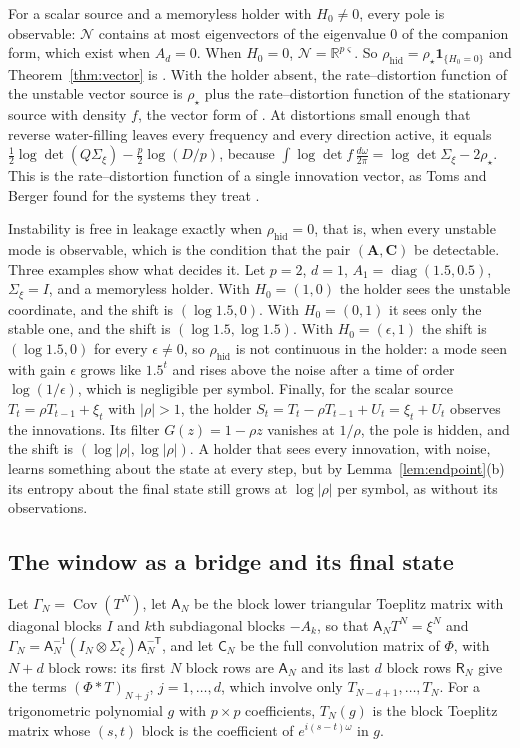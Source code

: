 \documentclass[11pt,onecolumn]{IEEEtran}
\newcommand{\R}{\mathbb{R}}
\newcommand{\Cov}{\operatorname{Cov}}
\newcommand{\dw}{\tfrac{d\omega}{2\pi}}
\newcommand{\bA}{\mathbf A}
\newcommand{\bC}{\mathbf C}
\newcommand{\rhid}{\rho_{\mathrm{hid}}}
\begin{document}
For a scalar source and a memoryless holder with $H_0\ne0$, every pole
is observable: $\mathcal N$ contains at most eigenvectors of the
eigenvalue $0$ of the companion form, which exist when $A_d=0$. When
$H_0=0$, $\mathcal N=\R^{p\varsigma}$. So
$\rhid=\rho_\star\mathbf 1_{\{H_0=0\}}$ and Theorem~\ref{thm:vector} is
\cite[Theorem~26]{part3}. With the holder absent, the rate--distortion
function of the unstable vector source is $\rho_\star$ plus the
rate--distortion function of the stationary source with density $f$,
the vector form of \cite{hashimoto1980,grayhashimoto2008}. At
distortions small enough that reverse water-filling leaves every
frequency and every direction active, it equals
$\tfrac12\log\det(Q\Sigma_\xi)-\tfrac p2\log(D/p)$, because
$\int\log\det f\,\dw=\log\det\Sigma_\xi-2\rho_\star$. This is the
rate--distortion function of a single innovation vector, as Toms and
Berger found for the systems they treat \cite{toms1971}.

Instability is free in leakage exactly when $\rhid=0$, that is, when
every unstable mode is observable, which is the condition that the pair
$(\bA,\bC)$ be detectable. Three examples show what decides it. Let
$p=2$, $d=1$, $A_1=\operatorname{diag}(1.5,0.5)$, $\Sigma_\xi=I$, and a
memoryless holder. With $H_0=(1,0)$ the holder sees the unstable
coordinate, and the shift is $(\log1.5,0)$. With $H_0=(0,1)$ it sees
only the stable one, and the shift is $(\log1.5,\log1.5)$. With
$H_0=(\epsilon,1)$ the shift is $(\log1.5,0)$ for every $\epsilon\ne0$,
so $\rhid$ is not continuous in the holder: a mode seen with gain
$\epsilon$ grows like $1.5^t$ and rises above the noise after a time of
order $\log(1/\epsilon)$, which is negligible per symbol. Finally, for
the scalar source $T_t=\rho T_{t-1}+\xi_t$ with $|\rho|>1$, the holder
$S_t=T_t-\rho T_{t-1}+U_t=\xi_t+U_t$ observes the innovations. Its
filter $G(z)=1-\rho z$ vanishes at $1/\rho$, the pole is hidden, and
the shift is $(\log|\rho|,\log|\rho|)$. A holder that sees every
innovation, with noise, learns something about the state at every step,
but by Lemma~\ref{lem:endpoint}(b) its entropy about the final state
still grows at $\log|\rho|$ per symbol, as without its observations.

\subsection{The window as a bridge and its final state}

Let $\Gamma_N=\Cov(T^N)$, let $\mathsf A_N$ be the block lower
triangular Toeplitz matrix with diagonal blocks $I$ and $k$th
subdiagonal blocks $-A_k$, so that $\mathsf A_NT^N=\xi^N$ and
$\Gamma_N=\mathsf A_N^{-1}(I_N\otimes\Sigma_\xi)\mathsf A_N^{-\mathsf T}$,
and let $\mathsf C_N$ be the full convolution matrix of $\Phi$, with
$N+d$ block rows: its first $N$ block rows are $\mathsf A_N$ and its
last $d$ block rows $\mathsf R_N$ give the terms
$(\Phi\ast T)_{N+j}$, $j=1,\dots,d$, which involve only
$T_{N-d+1},\dots,T_N$. For a trigonometric polynomial $g$ with
$p\times p$ coefficients, $T_N(g)$ is the block Toeplitz matrix whose
$(s,t)$ block is the coefficient of $e^{i(s-t)\omega}$ in $g$.
\end{document}
